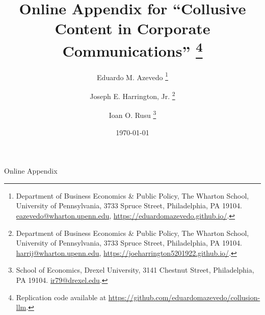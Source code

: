 \documentclass[12pt]{article}
\begin{document}
\title{Online Appendix for ``Collusive Content in Corporate Communications''%
\thanks{Replication code available at \url{https://github.com/eduardomazevedo/collusion-llm}.}
}

\author{Eduardo M. Azevedo%
\thanks{Department of Business Economics \& Public Policy, The Wharton School, University of Pennsylvania, 3733 Spruce Street, Philadelphia, PA 19104. \href{mailto:eazevedo@wharton.upenn.edu}{eazevedo@wharton.upenn.edu}, \url{https://eduardomazevedo.github.io/}.}
\and Joseph E. Harrington, Jr.%
\thanks{Department of Business Economics \& Public Policy, The Wharton School, University of Pennsylvania, 3733 Spruce Street, Philadelphia, PA 19104. \href{mailto:harrij@wharton.upenn.edu}{harrij@wharton.upenn.edu}, \url{https://joeharrington5201922.github.io/}.}
\and Ioan O. Rusu%
\thanks{School of Economics, Drexel University, 3141 Chestnut Street, Philadelphia, PA 19104. \href{mailto:ir79@drexel.edu}{ir79@drexel.edu}.}
}

\date{\today}

\maketitle
\begin{center}
{\huge Online Appendix}{\huge\par}
\end{center}
\vspace{1em}

\tableofcontents
\vspace{1em}

\renewcommand{\thesection}{\Alph{section}}
\setcounter{table}{0}
\makeatletter
{}
\makeatother
\renewcommand{\thetable}{\thesection.\arabic{table}}







\printbibliography
\end{document}
